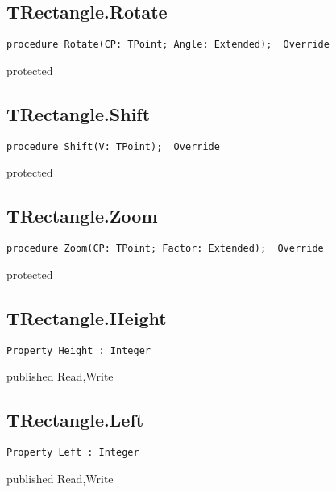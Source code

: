 \subsection{TRectangle.Rotate}
\label{hmi:drawncontrol:trectangle:rotate}
\begin{FPCList}
\Declaration 

\begin{verbatim}
procedure Rotate(CP: TPoint; Angle: Extended);  Override
\end{verbatim}
\Visibility
protected
\end{FPCList}
\subsection{TRectangle.Shift}
\label{hmi:drawncontrol:trectangle:shift}
\begin{FPCList}
\Declaration 

\begin{verbatim}
procedure Shift(V: TPoint);  Override
\end{verbatim}
\Visibility
protected
\end{FPCList}
\subsection{TRectangle.Zoom}
\label{hmi:drawncontrol:trectangle:zoom}
\begin{FPCList}
\Declaration 

\begin{verbatim}
procedure Zoom(CP: TPoint; Factor: Extended);  Override
\end{verbatim}
\Visibility
protected
\end{FPCList}
\subsection{TRectangle.Height}
\label{hmi:drawncontrol:trectangle:height}
\begin{FPCList}
\Declaration 

\begin{verbatim}
Property Height : Integer
\end{verbatim}
\Visibility
published
\Access
Read,Write
\end{FPCList}
\subsection{TRectangle.Left}
\label{hmi:drawncontrol:trectangle:left}
\begin{FPCList}
\Declaration 

\begin{verbatim}
Property Left : Integer
\end{verbatim}
\Visibility
published
\Access
Read,Write
\end{FPCList}
